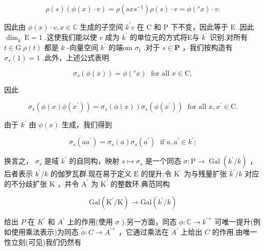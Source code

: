 \documentclass[10pt]{article}
\begin{document}
\[
\rho \left( s\right) \left( {\phi \left( x\right)  \cdot  v}\right)  = \rho \left( {{sx}{s}^{-1}}\right) \rho \left( s\right)  \cdot  v = \phi \left( {{}^{s}x}\right)  \cdot  v.
\]

因此由 \(\phi \left( x\right)  \cdot  v,x \in  \mathbb{C}\) 生成的子空间 \({k}^{\prime }v\) 在 \(\mathrm{C}\) 和 \(\mathrm{P}\) 下不变，因此等于 \(\mathrm{E}\) .因此 \({\dim }_{{k}^{\prime }}\mathrm{E} = 1\) .这使我们能以使 \(v\) 成为 \({k}^{\prime }\) 的单位元的方式将E与 \({k}^{\prime }\) 识别.对所有 \(t \in  \mathrm{G} \; \rho \left( t\right)\) 都是 \(k\) -向量空间 \({k}^{\prime }\) 的端om \({\sigma }_{t}\) .对于 \(s \in  \mathbf{P}\) ，我们按构造有 \({\sigma }_{s}\left( 1\right)  = 1\) .此外，上述公式表明

\[
{\sigma }_{s}\left( {\phi \left( x\right) }\right)  = \phi \left( {{}^{s}x}\right) \;\text{ for all }x \in  \mathrm{C},
\]

因此

\[
{\sigma }_{s}\left( {\phi \left( x\right) \phi \left( {x}^{\prime }\right) }\right)  = {\sigma }_{s}\left( {\phi \left( x\right) }\right) {\sigma }_{s}\left( {\phi \left( {x}^{\prime }\right) }\right) \;\text{ for all }x,{x}^{\prime } \in  \mathrm{C}.
\]

由于 \({k}^{\prime }\) 由 \(\phi \left( x\right)\) 生成，我们得到

\[
{\sigma }_{s}\left( {a{a}^{\prime }}\right)  = {\sigma }_{s}\left( a\right) {\sigma }_{s}\left( {a}^{\prime }\right) \;\text{ if }a,{a}^{\prime } \in  {k}^{\prime };
\]

换言之， \({\sigma }_{s}\) 是域 \({k}^{\prime }\) 的自同构，映射 \(s \mapsto  {\sigma }_{s}\) 是一个同态 \(\sigma  : \mathrm{P} \rightarrow  \operatorname{Gal}\left( {{k}^{\prime }/k}\right)\) ，后者表示 \({k}^{\prime }/k\) 的伽罗瓦群.现在易于定义 \(\mathrm{E}\) 的提升:令 \({\mathrm{K}}^{\prime }\) 为与残量扩张 \({k}^{\prime }/k\) 对应的不分歧扩张 \(\mathrm{K}\) ，并令 \({\mathrm{A}}^{\prime }\) 为 \({\mathrm{K}}^{\prime }\) 的整数环.典范同构

\[
\mathrm{{Gal}}\left( {{\mathrm{K}}^{\prime }/\mathrm{K}}\right)  \rightarrow  \mathrm{{Gal}}\left( {{k}^{\prime }/k}\right)
\]

给出 \(P\) 在 \({K}^{\prime }\) 和 \({A}^{\prime }\) 上的作用(使用 \(\sigma\) ).另一方面，同态 \(\phi  : \mathbb{C} \rightarrow  {k}^{\prime  * }\) 可唯一提升(例如使用乘法表示)为同态 \(\widetilde{\phi } : C \rightarrow  {A}^{\prime  * }\) ，它通过乘法在 \({A}^{\prime }\) 上给出 \(C\) 的作用.由唯一性立刻(可见)我们仍然有
\end{document}
